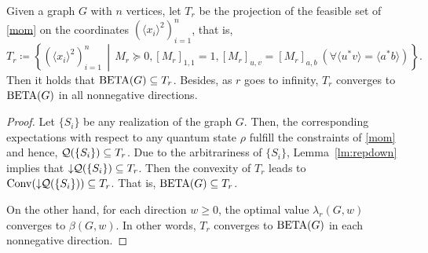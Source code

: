 \begin{theorem}
Given a graph $G$ with $n$ vertices, let $T_r$ be the projection of the feasible set of \eqref{mom} on the coordinates $\left(\langle x_i\rangle^2\right)_{i=1}^n$, that is,
\begin{equation}
    T_r\coloneqq\left\{\left(\langle x_i\rangle^2\right)_{i=1}^n\,\middle|\, M_r\succeq0, [M_r]_{1,1}=1, [M_r]_{u,v}=[M_r]_{a,b}\ (\forall\langle u^*v\rangle=\langle a^*b\rangle)\right\}.
\end{equation}
Then it holds that $\operatorname{BETA}(G) \subseteq T_r$. Besides, as $r$ goes to infinity, $T_r$ converges to $\operatorname{BETA}(G)$ in all nonnegative directions.
\end{theorem}
\begin{proof}
Let $\{S_i\}$ be any realization of the graph $G$. Then, the corresponding expectations with respect to any quantum state $\rho$ fulfill the constraints of \eqref{mom} and hence, ${\cal Q}(\{S_i\}) \subseteq T_r$.
Due to the arbitrariness of $\{S_i\}$, Lemma~\ref{lm:repdown} implies that $\downarrow\hspace{-0.3em} {\cal Q}(\{S_i\}) \subseteq T_r$. Then the convexity of $T_r$ leads to $\mathrm{Conv}(\downarrow\hspace{-0.3em}{\cal Q}(\{S_i\})) \subseteq T_r$.
That is, $\operatorname{BETA}(G) \subseteq T_r$.

On the other hand, for each direction $w \ge 0$, the optimal value $\lambda_r(G,w)$ converges to $\beta(G,w)$. In other words, $T_r$ converges to $\operatorname{BETA}(G)$ in each nonnegative direction.
\end{proof}

